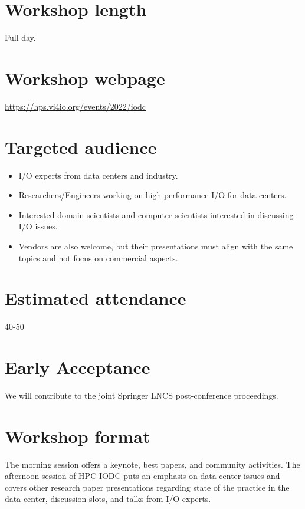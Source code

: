 \documentclass[a4paper,10pt]{article}
\begin{document}
\section{Workshop length}
Full day.

\section{Workshop webpage}
\url{https://hps.vi4io.org/events/2022/iodc}


\section{Targeted audience}
\begin{itemize}
\item I/O experts from data centers and industry.
\item Researchers/Engineers working on high-performance I/O for data centers.
\item Interested domain scientists and computer scientists interested in discussing I/O issues.
\item Vendors are also welcome, but their presentations must align with the same topics and not focus on commercial aspects.
\end{itemize}




\section{Estimated attendance}
40-50

\section{Early Acceptance}

We will contribute to the joint Springer LNCS post-conference proceedings.


\section{Workshop format}
The morning session offers a keynote, best papers, and community activities.
The afternoon session of HPC-IODC puts an emphasis on data center issues and covers other research paper presentations regarding state of the practice in the data center, discussion slots, and talks from I/O experts.
\end{document}
